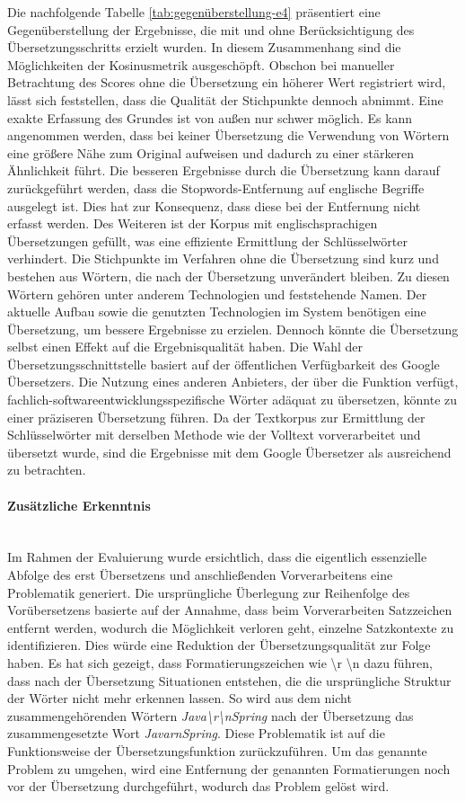 Die nachfolgende Tabelle \ref{tab:gegenüberstellung-e4} präsentiert eine Gegenüberstellung der Ergebnisse, die mit und ohne Berücksichtigung des Übersetzungsschritts erzielt wurden. In diesem Zusammenhang sind die Möglichkeiten der Kosinusmetrik ausgeschöpft. Obschon bei manueller Betrachtung des Scores ohne die Übersetzung ein höherer Wert registriert wird, lässt sich feststellen, dass die Qualität der Stichpunkte dennoch abnimmt. Eine exakte Erfassung des Grundes ist von außen nur schwer möglich. Es kann angenommen werden, dass bei keiner Übersetzung die Verwendung von Wörtern eine größere Nähe zum Original aufweisen und dadurch zu einer stärkeren Ähnlichkeit führt. Die besseren Ergebnisse durch die Übersetzung kann darauf zurückgeführt werden, dass die Stopwords-Entfernung auf englische Begriffe ausgelegt ist. Dies hat zur Konsequenz, dass diese bei der Entfernung nicht erfasst werden. Des Weiteren ist der Korpus mit englischsprachigen Übersetzungen gefüllt, was eine effiziente Ermittlung der Schlüsselwörter verhindert. Die Stichpunkte im Verfahren ohne die Übersetzung sind kurz und bestehen aus Wörtern, die nach der Übersetzung unverändert bleiben. Zu diesen Wörtern gehören unter anderem Technologien und feststehende Namen. Der aktuelle Aufbau sowie die genutzten Technologien im System benötigen eine Übersetzung, um bessere Ergebnisse zu erzielen. Dennoch könnte die Übersetzung selbst einen Effekt auf die Ergebnisqualität haben. Die Wahl der Übersetzungsschnittstelle basiert auf der öffentlichen Verfügbarkeit des Google Übersetzers. Die Nutzung eines anderen Anbieters, der über die Funktion verfügt, fachlich-softwareentwicklungsspezifische Wörter adäquat zu übersetzen, könnte zu einer präziseren Übersetzung führen. Da der Textkorpus zur Ermittlung der Schlüsselwörter mit derselben Methode wie der Volltext vorverarbeitet und übersetzt wurde, sind die Ergebnisse mit dem Google Übersetzer als ausreichend zu betrachten.
\paragraph{Zusätzliche Erkenntnis}\mbox{}\\
Im Rahmen der Evaluierung wurde ersichtlich, dass die eigentlich essenzielle Abfolge des erst Übersetzens und anschließenden Vorverarbeitens eine Problematik generiert. Die ursprüngliche Überlegung zur Reihenfolge des Vorübersetzens basierte auf der Annahme, dass beim Vorverarbeiten Satzzeichen entfernt werden, wodurch die Möglichkeit verloren geht, einzelne Satzkontexte zu identifizieren. Dies würde eine Reduktion der Übersetzungsqualität zur Folge haben. Es hat sich gezeigt, dass Formatierungszeichen wie \textbackslash r \textbackslash n dazu führen, dass nach der Übersetzung Situationen entstehen, die die ursprüngliche Struktur der Wörter nicht mehr erkennen lassen. So wird aus dem nicht zusammengehörenden Wörtern \emph{Java\textbackslash r\textbackslash nSpring} nach der Übersetzung das zusammengesetzte Wort \emph{JavarnSpring}. Diese Problematik ist auf die Funktionsweise der Übersetzungsfunktion zurückzuführen. Um das genannte Problem zu umgehen, wird eine Entfernung der genannten Formatierungen noch vor der Übersetzung durchgeführt, wodurch das Problem gelöst wird.\\

